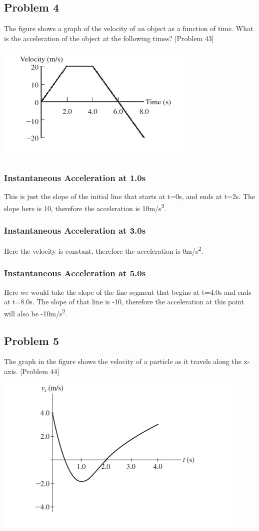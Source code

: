 \documentclass{article}
\begin{document}
\subsection{Problem 4} 
The figure shows a graph of the velocity of an object as a function of time. What is the acceleration of the object at the following times? [Problem 43]
\begin{center} 
\includegraphics[scale=0.6]{problem43.PNG}
\end{center}
\subsubsection{Instantaneous Acceleration at 1.0s}  
This is just the slope of the initial line that starts at t=0s, and ends at t=2s. The slope here is 10, therefore the acceleration is 10\si[per-mode=symbol]{\meter\per\second\squared}. 
\subsubsection{Instantaneous Acceleration at 3.0s}
Here the velocity is constant, therefore the acceleration is 0\si[per-mode=symbol]{\meter\per\second\squared}. 
\subsubsection{Instantaneous Acceleration at 5.0s} Here we would take the slope of the line segment that begins at t=4.0s and ends at t=8.0s. The slope of that line is -10, therefore the acceleration at this point will also be -10\si[per-mode=symbol]{\meter\per\second\squared}.
\subsection{Problem 5}
The graph in the figure shows the velocity of a particle as it travels along the x-axis. [Problem 44] 
\begin{center} 
\includegraphics[scale=0.5]{problem44.PNG}
\end{center} 
\end{document}
